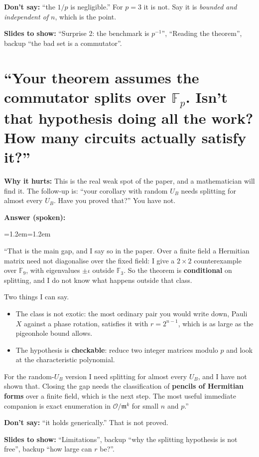 \documentclass[11pt,a4paper]{article}
\newcommand{\FF}{\mathbb{F}}
\newcommand{\OK}{\mathcal{O}}
\newcommand{\mm}{\mathfrak{m}}
\newenvironment{answer}
  {\par\noindent\textbf{\color{navy}Answer (spoken):}\par
   \begin{list}{}{\leftmargin=1.2em\rightmargin=1.2em}\item\relax}
  {\end{list}}
\newcommand{\avoid}[1]{\par\noindent\textbf{\color{BrickRed}Don't say:} #1\par}
\newcommand{\slides}[1]{\par\noindent\textbf{\color{ForestGreen}Slides to show:} #1\par}
\newcommand{\why}[1]{\par\noindent\textbf{Why it hurts:} #1\par}
\begin{document}
\avoid{``the $1/p$ is negligible.'' For $p=3$ it is not. Say it is
\emph{bounded and independent of $n$}, which is the point.}

\slides{``Surprise 2: the benchmark is $p^{-1}$'', ``Reading the theorem'',
backup ``the bad set is a commutator''.}

\section{``Your theorem assumes the commutator splits over $\FF_p$. Isn't that hypothesis doing all the work? How many circuits actually satisfy it?''}

\why{This is the real weak spot of the paper, and a mathematician will find
it. The follow-up is: ``your corollary with random $U_B$ needs splitting for
almost every $U_B$. Have you proved that?'' You have not.}

\begin{answer}
``That is the main gap, and I say so in the paper. Over a finite field a
Hermitian matrix need not diagonalise over the fixed field: I give a
$2\times2$ counterexample over $\FF_9$, with eigenvalues $\pm\iota$ outside
$\FF_3$. So the theorem is \textbf{conditional} on splitting, and I do not
know what happens outside that class.

Two things I can say.
\begin{itemize}
  \item The class is not exotic: the most ordinary pair you would write
    down, Pauli $X$ against a phase rotation, satisfies it with
    $r=2^{n-1}$, which is as large as the pigeonhole bound allows.
  \item The hypothesis is \textbf{checkable}: reduce two integer matrices
    modulo $p$ and look at the characteristic polynomial.
\end{itemize}
For the random-$U_B$ version I need splitting for almost every $U_B$, and I
have not shown that. Closing the gap needs the classification of
\textbf{pencils of Hermitian forms} over a finite field, which is the next
step. The most useful immediate companion is exact enumeration in
$\OK/\mm^{k}$ for small $n$ and $p$.''
\end{answer}

\avoid{``it holds generically.'' That is not proved.}

\slides{``Limitations'', backup ``why the splitting hypothesis is not
free'', backup ``how large can $r$ be?''.}
\end{document}
